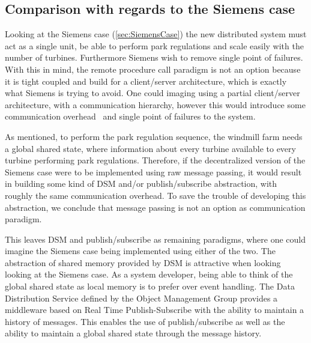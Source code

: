 \subsection{Comparison with regards to the Siemens case}
Looking at the Siemens case (\cref{sec:SiemensCase}) the new distributed system must act as a single unit, be able to perform park regulations and scale easily with the number of turbines. Furthermore Siemens wish to remove single point of failures. With this in mind, the remote procedure call paradigm is not an option because it is tight coupled and build for a client/server architecture, which is exactly what Siemens is trying to avoid. One could imaging using a partial client/server architecture, with a communication hierarchy, however this would introduce some communication overhead~\cite{Yu1997JavaDSM} and single point of failures to the system.

As mentioned, to perform the park regulation sequence, the windmill farm needs a global shared state, where information about every turbine available to every turbine performing park regulations. Therefore, if the decentralized version of the Siemens case were to be implemented using raw message passing, it would result in building some kind of DSM and/or publish/subscribe abstraction, with roughly the same communication overhead. To save the trouble of developing this abstraction, we conclude that message passing is not an option as communication paradigm.

This leaves DSM and publish/subscribe as remaining paradigms, where one could imagine the Siemens case being implemented using either of the two. The abstraction of shared memory provided by DSM is attractive when looking looking at the Siemens case. As a system developer, being able to think of the global shared state as local memory is to prefer over event handling. The Data Distribution Service defined by the Object Management Group provides a middleware based on Real Time Publish-Subscribe with the ability to maintain a history of messages. This enables the use of publish/subscribe as well as the ability to maintain a global shared state through the message history.


